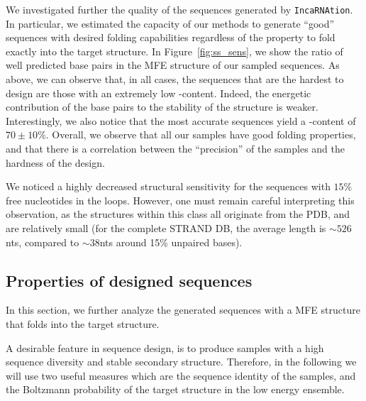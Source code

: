 \documentclass{bioinfo}
\newcommand{\GCContent}{\Gb\Cb-content\xspace}
\newcommand{\ourprog}{\texttt{IncaRNAtion}\xspace}
\newcommand{\Cb}{{\sf{C}}\xspace}
\newcommand{\Gb}{{\sf{G}}\xspace}
\begin{document}
We investigated further the quality of the sequences generated by \ourprog. In particular, we estimated the capacity of our methods to generate ``good'' sequences with desired folding capabilities regardless of the property  to fold exactly into the target structure. In Figure~\ref{fig:ss_sens}, we show the ratio of well predicted base pairs in the MFE structure of our sampled sequences. As above, we can observe that, in all cases, the sequences that are the hardest to design are those with an extremely low \GCContent. Indeed, the energetic contribution of the base pairs to the stability of the structure is weaker. Interestingly, we also notice that the most accurate sequences yield a \GCContent of $70\pm 10\%$. Overall, we observe that all our samples have good folding properties, and that there is a correlation between the ``precision'' of the samples and the hardness of the design.


We noticed a highly decreased structural sensitivity for the sequences with $15\%$ free nucleotides in the loops. 
However, one must remain careful interpreting this observation, as the structures within this class all originate from the PDB, and are relatively small (for the complete STRAND DB, the average length is $\sim526$nts, compared to $\sim38$nts around 15\% unpaired bases).

\begin{figure*}[ht!]
 	\centering
	\texttt{[image: \{Waldispuhl.337.fig.7]}.pdf}
	\caption{Structural sensitivity (i.e. $\#$ well predicted base pairs / $\#$ base pairs in target) of the sampled sequences MFE. }
	\label{fig:ss_sens}	
\end{figure*}

\subsection{Properties of designed sequences}

In this section, we further analyze the generated sequences with a MFE structure that folds into the target structure. 


A desirable feature in sequence design, is to produce samples with a high sequence diversity and stable secondary structure. 
Therefore, in the following we will use two useful measures which are the sequence identity of the samples, and the Boltzmann probability
of the target structure in the low energy ensemble.
\end{document}
